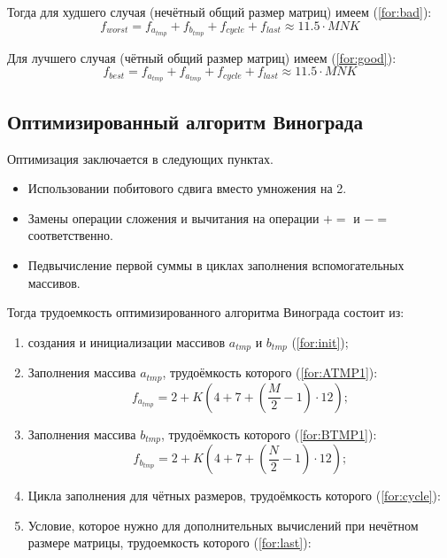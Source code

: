 Тогда для худшего случая (нечётный общий размер матриц) имеем (\ref{for:bad}):
\begin{equation}
	\label{for:bad}
	f_{worst} =  f_{a_{tmp}} + f_{b_{tmp}} + f_{cycle} + f_{last}\approx 11.5 \cdot MNK
\end{equation}

Для лучшего случая (чётный общий размер матриц) имеем (\ref{for:good}):
\begin{equation}
	\label{for:good}
	f_{best} =  f_{a_{tmp}} + f_{a_{tmp}} + f_{cycle} + f_{last} \approx 11.5 \cdot MNK
\end{equation}


\subsection{Оптимизированный алгоритм Винограда}

Оптимизация заключается в следующих пунктах.
\begin{itemize}
	\item Использовании побитового сдвига вместо умножения на 2.
	\item Замены операции сложения и вычитания на операции $+=$ и $-=$ соответственно.
	\item Педвычисление первой суммы в циклах заполнения вспомогательных массивов.
\end{itemize}

Тогда трудоемкость оптимизированного алгоритма Винограда состоит из:

\begin{enumerate}
	\item создания и инициализации массивов $a_{tmp}$ и $b_{tmp}$ (\ref{for:init});
	
	\item Заполнения массива $a_{tmp}$, трудоёмкость которого (\ref{for:ATMP1}):
\begin{equation}
	\label{for:ATMP1}
	f_{a_{tmp}} = 2 + K (4 + 7 +  (\frac{M}{2} - 1)  \cdot 12);
\end{equation}

\item Заполнения массива $b_{tmp}$, трудоёмкость которого (\ref{for:BTMP1}):
\begin{equation}
	\label{for:BTMP1}
	f_{b_{tmp}} = 2 + K (4 + 7 + (\frac{N}{2} - 1) \cdot 12);
\end{equation}
	\newline
	\item Цикла заполнения для чётных размеров, трудоёмкость которого (\ref{for:cycle}):
	
	\item Условие, которое нужно для дополнительных вычислений при нечётном размере матрицы, трудоемкость которого (\ref{for:last}):

\end{enumerate}

